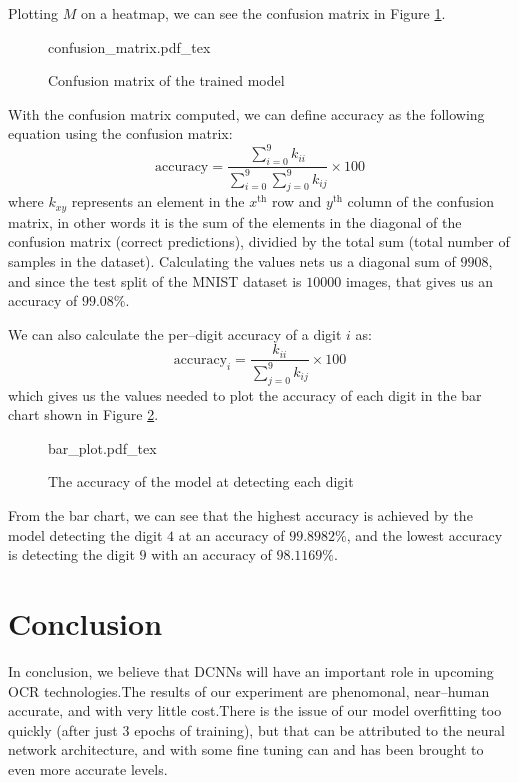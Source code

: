 \documentclass[conference]{IEEEtran}
\begin{document}
Plotting $M$ on a heatmap, we can see the confusion matrix in Figure \ref{fig:confusion_matrix}.
\begin{figure}[!htp]
    \centering
    \def\svgwidth{\columnwidth}
    \scriptsize
    {confusion_matrix.pdf_tex}
    \caption{Confusion matrix of the trained model}\label{fig:confusion_matrix}
\end{figure}
\par With the confusion matrix computed, we can define accuracy as the following equation using the confusion matrix:
\begin{equation}
    \text{accuracy} = \frac{\sum_{i = 0}^9 k_{ii}}{\sum_{i = 0}^9 \sum_{j = 0}^9 k_{ij}} \times 100
\end{equation}
where $k_{xy}$ represents an element in the $x^\text{th}$ row and $y^\text{th}$ column of the confusion matrix, in other words it is the sum of the elements in the diagonal of the confusion matrix (correct predictions), dividied by the total sum (total number of samples in the dataset). Calculating the values nets us a diagonal sum of $9908$, and since the test split of the MNIST dataset is $10000$ images, that gives us an accuracy of $99.08\%$.
\par
We can also calculate the per--digit accuracy of a digit $i$ as:
\begin{equation}
    \text{accuracy}_{i} = \frac{k_{ii}}{\sum_{j = 0}^9 k_{ij}} \times 100
\end{equation}
which gives us the values needed to plot the accuracy of each digit in the bar chart shown in Figure \ref{fig:bar}.
\begin{figure}[!htp]
    \centering
    \def\svgwidth{\columnwidth}
    {bar_plot.pdf_tex}
    \caption{The accuracy of the model at detecting each digit}\label{fig:bar}
\end{figure}
\par From the bar chart, we can see that the highest accuracy is achieved by the model detecting the digit $4$ at an accuracy of $99.8982\%$, and the lowest accuracy is detecting the digit $9$ with an accuracy of $98.1169\%$.
\section{Conclusion}
In conclusion, we believe that DCNNs will have an important role in upcoming OCR technologies.\@ The results of our experiment are phenomonal, near--human accurate, and with very little cost.\@ There is the issue of our model overfitting too quickly (after just 3 epochs of training), but that can be attributed to the neural network architecture, and with some fine tuning can and has been brought to even more accurate levels.\@



\end{document}
